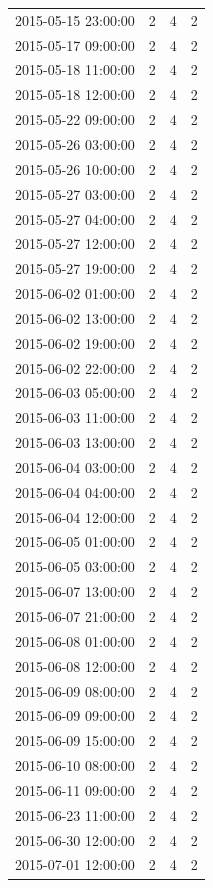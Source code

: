 \begin{tabular}{lrrr}
2015-05-15 23:00:00 & 2 & 4 & 2 \\
2015-05-17 09:00:00 & 2 & 4 & 2 \\
2015-05-18 11:00:00 & 2 & 4 & 2 \\
2015-05-18 12:00:00 & 2 & 4 & 2 \\
2015-05-22 09:00:00 & 2 & 4 & 2 \\
2015-05-26 03:00:00 & 2 & 4 & 2 \\
2015-05-26 10:00:00 & 2 & 4 & 2 \\
2015-05-27 03:00:00 & 2 & 4 & 2 \\
2015-05-27 04:00:00 & 2 & 4 & 2 \\
2015-05-27 12:00:00 & 2 & 4 & 2 \\
2015-05-27 19:00:00 & 2 & 4 & 2 \\
2015-06-02 01:00:00 & 2 & 4 & 2 \\
2015-06-02 13:00:00 & 2 & 4 & 2 \\
2015-06-02 19:00:00 & 2 & 4 & 2 \\
2015-06-02 22:00:00 & 2 & 4 & 2 \\
2015-06-03 05:00:00 & 2 & 4 & 2 \\
2015-06-03 11:00:00 & 2 & 4 & 2 \\
2015-06-03 13:00:00 & 2 & 4 & 2 \\
2015-06-04 03:00:00 & 2 & 4 & 2 \\
2015-06-04 04:00:00 & 2 & 4 & 2 \\
2015-06-04 12:00:00 & 2 & 4 & 2 \\
2015-06-05 01:00:00 & 2 & 4 & 2 \\
2015-06-05 03:00:00 & 2 & 4 & 2 \\
2015-06-07 13:00:00 & 2 & 4 & 2 \\
2015-06-07 21:00:00 & 2 & 4 & 2 \\
2015-06-08 01:00:00 & 2 & 4 & 2 \\
2015-06-08 12:00:00 & 2 & 4 & 2 \\
2015-06-09 08:00:00 & 2 & 4 & 2 \\
2015-06-09 09:00:00 & 2 & 4 & 2 \\
2015-06-09 15:00:00 & 2 & 4 & 2 \\
2015-06-10 08:00:00 & 2 & 4 & 2 \\
2015-06-11 09:00:00 & 2 & 4 & 2 \\
2015-06-23 11:00:00 & 2 & 4 & 2 \\
2015-06-30 12:00:00 & 2 & 4 & 2 \\
2015-07-01 12:00:00 & 2 & 4 & 2 \\

\end{tabular}
